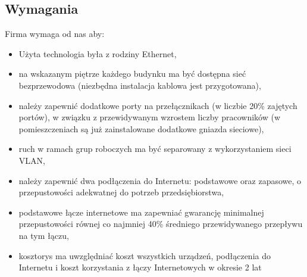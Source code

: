 \documentclass[a4paper,12pt]{extarticle}  %
\begin{document}
\subsection{Wymagania}
Firma wymaga od nas aby:
\begin{itemize}
	\item Użyta technologia była z rodziny Ethernet,
	\item na wskazanym piętrze każdego budynku ma być dostępna sieć bezprzewodowa (niezbędna instalacja
	      kablowa jest przygotowana),
	\item należy zapewnić dodatkowe porty na przełącznikach (w liczbie 20\% zajętych portów), w związku z 
	      przewidywanym wzrostem liczby pracowników (w pomieszczeniach są już zainstalowane
	      dodatkowe gniazda sieciowe),
	\item ruch w ramach grup roboczych ma być separowany z wykorzystaniem sieci VLAN,
	\item należy  zapewnić  dwa  podłączenia  do  Internetu:  podstawowe  oraz  zapasowe,  o  przepustowości
	      adekwatnej do potrzeb przedsiębiorstwa,
	\item podstawowe  łącze  internetowe  ma  zapewniać  gwarancję  minimalnej  przepustowości  równej  co
	      najmniej 40\% średniego przewidywanego przepływu na tym łączu, 
	\item kosztorys ma uwzględniać koszt wszystkich urządzeń, podłączenia do Internetu i koszt korzystania z
	      łączy Internetowych w okresie 2 lat
\end{itemize}
\end{document}

